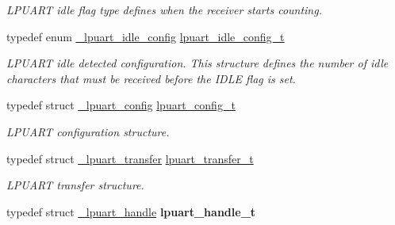 \begin{DoxyCompactItemize}
\begin{DoxyCompactList}\small\item\em L\+P\+U\+A\+RT idle flag type defines when the receiver starts counting. \end{DoxyCompactList}\item 
\mbox{\label{group__lpuart__driver_ga48780347b56ffcf164d92df6957c8ab4}} 
typedef enum \mbox{\hyperlink{group__lpuart__driver_ga13c97cefe85629e606de5281d4eef25b}{\+\_\+lpuart\+\_\+idle\+\_\+config}} \mbox{\hyperlink{group__lpuart__driver_ga48780347b56ffcf164d92df6957c8ab4}{lpuart\+\_\+idle\+\_\+config\+\_\+t}}
\begin{DoxyCompactList}\small\item\em L\+P\+U\+A\+RT idle detected configuration. This structure defines the number of idle characters that must be received before the I\+D\+LE flag is set. \end{DoxyCompactList}\item 
\mbox{\label{group__lpuart__driver_ga35757fcc752984cb90dafc2e815c3d05}} 
typedef struct \mbox{\hyperlink{struct__lpuart__config}{\+\_\+lpuart\+\_\+config}} \mbox{\hyperlink{group__lpuart__driver_ga35757fcc752984cb90dafc2e815c3d05}{lpuart\+\_\+config\+\_\+t}}
\begin{DoxyCompactList}\small\item\em L\+P\+U\+A\+RT configuration structure. \end{DoxyCompactList}\item 
\mbox{\label{group__lpuart__driver_ga1d4707ebc5d49dd655eedb7e5acd27fd}} 
typedef struct \mbox{\hyperlink{struct__lpuart__transfer}{\+\_\+lpuart\+\_\+transfer}} \mbox{\hyperlink{group__lpuart__driver_ga1d4707ebc5d49dd655eedb7e5acd27fd}{lpuart\+\_\+transfer\+\_\+t}}
\begin{DoxyCompactList}\small\item\em L\+P\+U\+A\+RT transfer structure. \end{DoxyCompactList}\item 
\mbox{\label{group__lpuart__driver_gaeae5fcbb252991c5f0cdc72dc8deae25}} 
typedef struct \mbox{\hyperlink{struct__lpuart__handle}{\+\_\+lpuart\+\_\+handle}} {\bfseries lpuart\+\_\+handle\+\_\+t}
\item 
\mbox{\label{group__lpuart__driver_ga558e0c23c05831e446708a3935f36332}} 

\end{DoxyCompactItemize}
